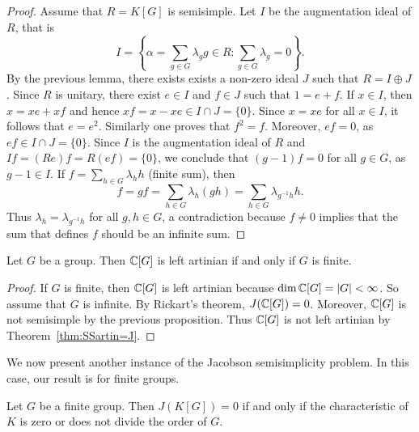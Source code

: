 \begin{proof}
	Assume that $R=K[G]$ is semisimple.  Let $I$ 
	be the augmentation ideal of $R$, that is
	\[
	I=\left\{\alpha=\sum_{g\in G}\lambda_gg\in R:\sum_{g\in G}\lambda_g=0\right\}.
	\]
	By the previous lemma, 
	there exists exists a non-zero ideal $J$ such that 
	$R=I\oplus J$. Since $R$ is unitary, there exist $e\in I$ and $f\in J$ such that
	$1=e+f$. If
	$x\in I$, then $x=xe+xf$ and hence $xf=x-xe\in I\cap J=\{0\}$. Since 
	$x=xe$ for all $x\in I$, it follows that $e=e^2$. Similarly one proves
	that $f^2=f$. Moreover, $ef=0$, as $ef\in I\cap J=\{0\}$.  Since $I$ 
	is the augmentation ideal of $R$ and $If=(Re)f=R(ef)=\{0\}$, we conclude that
	$(g-1)f=0$
	for all $g\in G$, as $g-1\in I$. If $f=\sum_{h\in
	G}\lambda_hh$ (finite sum), then  
	\[
	f=gf=\sum_{h\in G}\lambda_h(gh)=\sum_{h\in
	G}\lambda_{g^{-1}h}h.
	\]
	Thus $\lambda_h=\lambda_{g^{-1}h}$ for all $g,h\in G$, a contradiction because 
	$f\ne 0$ implies that the sum that defines $f$ should be an infinite sum.
\end{proof}


\begin{theorem}
	Let $G$ be a group. Then $\mathbb{C}[G]$ 
	is left artinian if and only if 
	$G$ is finite. 
\end{theorem}

\begin{proof}
    If $G$ is finite, then $\mathbb{C}[G]$ is left artinian because $\dim\mathbb{C}[G]=|G|<\infty$. So assume that 
    $G$ is infinite. By Rickart's theorem,   
	$J(\mathbb{C}[G])=0$. Moreover, $\mathbb{C}[G]$
	is not semisimple by the previous proposition. Thus
	$\mathbb{C}[G]$ is not left artinian by Theorem~\ref{thm:SSartin=J}.
\end{proof}


We now present another instance of the Jacobson semisimplicity problem.
In this case, our result is for finite groups. 

\begin{theorem}[Maschke]
	Let $G$ be a finite group. Then $J(K[G])=0$ if and only 
	if the characteristic of $K$ is zero 
	or does not divide the order of $G$. 
\end{theorem}

